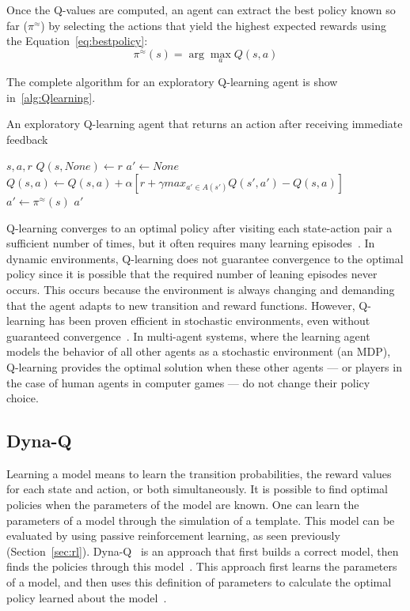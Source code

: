 Once the Q-values are computed, an agent can extract the best policy known so far ($\pi^{\approx}$) by selecting the actions that yield the highest expected rewards using the Equation~\ref{eq:bestpolicy}:
\begin{equation} \label{eq:bestpolicy}
	\pi^{\approx}(s) = \arg\max_{a}Q(s,a)
\end{equation}

The complete algorithm for an exploratory Q-learning agent is show in~\ref{alg:Qlearning}.

\begin{algorithm}
	\caption{An exploratory Q-learning agent that returns an action after receiving immediate feedback}
	\label{alg:Qlearning}
	\begin{algorithmic}[1]
		\REQUIRE $s, a, r$
			\STATE $Q(s,None) \gets r$
			\STATE $a' \gets None$
		\ELSE
			\STATE $Q(s,a) \gets Q(s,a) + \alpha[r + \gamma max_{a' \in A(s')}Q(s',a') - Q(s,a)]$
			\STATE $a' \gets \pi^{\approx}(s)$
		\ENDIF
		\RETURN $a'$
	\end{algorithmic}
\end{algorithm}

Q-learning converges to an optimal policy after visiting each state-action pair a sufficient number of times, but it often requires many learning episodes~\cite{watkins1992technical}.
In dynamic environments, Q-learning does not guarantee convergence to the optimal policy since it is possible that the required number of leaning episodes never occurs.
This occurs because the environment is always changing and demanding that the agent adapts to new transition and reward functions.
However, Q-learning has been proven efficient in stochastic environments, even without guaranteed convergence~\cite{sandholm1996multiagent,tesauro2002pricing,amato2010highlevel}.
In multi-agent systems, where the learning agent models the behavior of all other agents as a stochastic environment (an MDP), Q-learning provides the optimal solution when these other agents
--- or players in the case of human agents in computer games --- do not change their policy choice. 



\subsection{Dyna-Q}
\label{subsec:dynaq}

Learning a model means to learn the transition probabilities, the reward values for each state and action, or both simultaneously.
It is possible to find optimal policies when the parameters of the model are known.
One can learn the parameters of a model through the simulation of a template.
This model can be evaluated by using passive reinforcement learning, as seen previously (Section~\ref{sec:rl}).
Dyna-Q~\cite{sutton1991dyna} is an approach that first builds a correct model, then finds the policies through this model~\cite{kaelbling1996reinforcement}.
This approach first learns the parameters of a model, and then uses this definition of parameters to calculate the optimal policy learned about the model~\cite{amato2010highlevel}.

